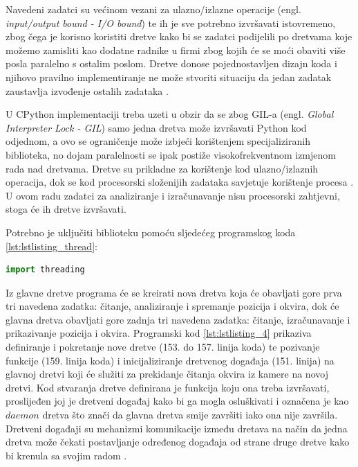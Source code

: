 \documentclass{foi}
\begin{document}
Navedeni zadatci su većinom vezani za ulazno/izlazne operacije (engl. \emph{input/output bound - I/O bound}) te ih je sve potrebno izvršavati istovremeno, zbog čega je korisno koristiti dretve kako bi se zadatci podijelili po dretvama koje možemo zamisliti kao dodatne radnike u firmi zbog kojih će se moći obaviti više posla paralelno s ostalim poslom. Dretve donose pojednostavljen dizajn koda i njihovo pravilno implementiranje ne može stvoriti situaciju da jedan zadatak zaustavlja izvođenje ostalih zadataka \cite{AndersonJim}.

U CPython implementaciji treba uzeti u obzir da se zbog GIL-a (engl. \emph{Global Interpreter Lock - GIL}) samo jedna dretva može izvršavati Python kod odjednom, a ovo se ograničenje može izbjeći korištenjem specijaliziranih biblioteka, no dojam paralelnosti se ipak postiže visokofrekventnom izmjenom rada nad dretvama. Dretve su prikladne za korištenje kod ulazno/izlaznih operacija, dok se kod procesorski složenijih zadataka savjetuje korištenje procesa \cite{PythonSoftwareFoundation2}. U ovom radu zadatci za analiziranje i izračunavanje nisu procesorski zahtjevni, stoga će ih dretve izvršavati.

\flushleft Potrebno je uključiti biblioteku pomoću sljedećeg programskog koda \ref{lst:lstlisting_thread}:
\begin{lstlisting}[language=Python, label={lst:lstlisting_thread}, firstnumber=2, style=colored, caption=Uključivanje biblioteke $threading$]
import threading
\end{lstlisting}

\justifying

Iz glavne dretve programa će se kreirati nova dretva koja će obavljati gore prva tri navedena zadatka: čitanje, analiziranje i spremanje pozicija i okvira, dok će glavna dretva obavljati gore zadnja tri navedena zadatka: čitanje, izračunavanje i prikazivanje pozicija i okvira. Programski kod \ref{lst:lstlisting_4} prikaziva definiranje i pokretanje nove dretve (153. do 157. linija koda) te pozivanje funkcije (159. linija koda) i inicijaliziranje dretvenog događaja (151. linija) na glavnoj dretvi koji će služiti za prekidanje čitanja okvira iz kamere na novoj dretvi. Kod stvaranja dretve definirana je funkcija koju ona treba izvršavati, proslijeđen joj je dretveni događaj kako bi ga mogla osluškivati i označena je kao $daemon$ dretva što znači da glavna dretva smije završiti iako ona nije završila. Dretveni događaji su mehanizmi komunikacije između dretava na način da jedna dretva može čekati postavljanje određenog događaja od strane druge dretve kako bi krenula sa svojim radom \cite{PythonSoftwareFoundation2}.
\end{document}
